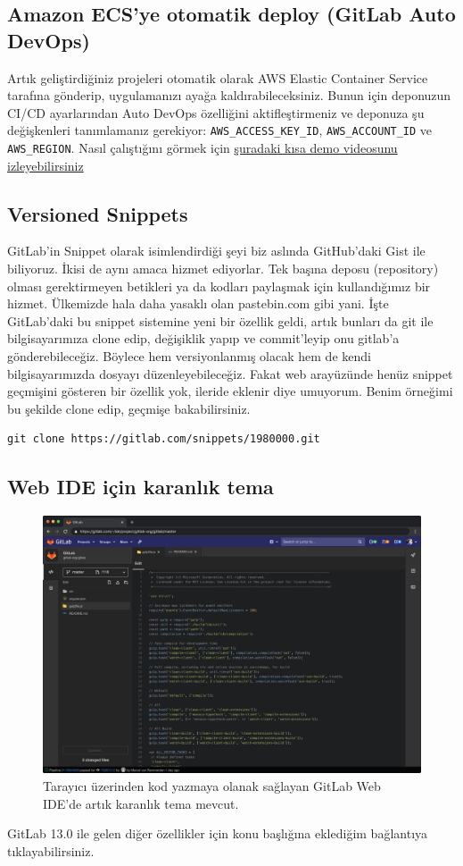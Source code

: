 \documentclass[11pt]{article}
\begin{document}
\subsection{Amazon ECS'ye otomatik deploy (GitLab Auto DevOps)}
\label{sec:orgfc7d8bd}
Artık geliştirdiğiniz projeleri otomatik olarak AWS Elastic Container Service
tarafına gönderip, uygulamanızı ayağa kaldırabileceksiniz. Bunun için
deponuzun CI/CD ayarlarından Auto DevOps özelliğini aktifleştirmeniz ve
deponuza şu değişkenleri tanımlamanız gerekiyor: \texttt{AWS\_ACCESS\_KEY\_ID},
\texttt{AWS\_ACCOUNT\_ID} ve \texttt{AWS\_REGION}. Nasıl çalıştığını görmek için \href{https://www.youtube.com/watch?v=AGerrF9KO30}{şuradaki kısa
demo videosunu izleyebilirsiniz}
\subsection{Versioned Snippets}
\label{sec:org80e9f3c}
GitLab'in Snippet olarak isimlendirdiği şeyi biz aslında GitHub'daki Gist ile
biliyoruz. İkisi de aynı amaca hizmet ediyorlar. Tek başına deposu
(repository) olması gerektirmeyen betikleri ya da kodları paylaşmak için
kullandığımız bir hizmet. Ülkemizde hala daha yasaklı olan pastebin.com gibi
yani. İşte GitLab'daki bu snippet sistemine yeni bir özellik geldi, artık
bunları da git ile bilgisayarımıza clone edip, değişiklik yapıp ve
commit'leyip onu gitlab'a gönderebileceğiz. Böylece hem versiyonlanmış olacak
hem de kendi bilgisayarımızda dosyayı düzenleyebileceğiz. Fakat web
arayüzünde henüz snippet geçmişini gösteren bir özellik yok, ileride eklenir
diye umuyorum. Benim örneğimi bu şekilde clone edip, geçmişe bakabilirsiniz.
\begin{verbatim}
git clone https://gitlab.com/snippets/1980000.git
\end{verbatim}
\subsection{Web IDE için karanlık tema}
\label{sec:org65c0083}
\begin{figure}[htbp]
\centering
\includegraphics[width=.9\linewidth]{gorseller/gitlab-web-ide-karanlik-tema.png}
\caption{Tarayıcı üzerinden kod yazmaya olanak sağlayan GitLab Web IDE'de artık karanlık tema mevcut.}
\end{figure}
\newpage
GitLab 13.0 ile gelen diğer özellikler için konu başlığına eklediğim
bağlantıya tıklayabilirsiniz.
\end{document}
